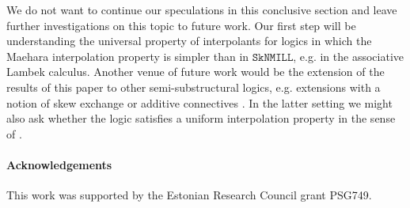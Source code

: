 \documentclass[sn-mathphys-num]{sn-jnl}%
\newcommand{\SkNMILL}{$\mathtt{SkNMILL}$}
\theoremstyle{thmstyleone}%
\theoremstyle{thmstyletwo}%
\theoremstyle{thmstylethree}%
\begin{document}
We do not want to continue our speculations in this conclusive section and leave further investigations on this topic to future work.
Our first step will be understanding the universal property of interpolants for logics in which the Maehara interpolation property is simpler than in \SkNMILL, e.g. in the associative Lambek calculus. 
Another venue of future work would be the  extension of the results of this paper to other semi-substructural logics, e.g. extensions with a notion of skew exchange \cite{veltri:coherence:2024} or additive connectives \cite{VW:2023}.
In the latter setting we might also ask whether the logic satisfies a uniform interpolation property in the sense of \cite{alizadeh:uniform:2014}.

\paragraph{Acknowledgements}
This work was supported by the Estonian Research Council grant PSG749.







\end{document}
